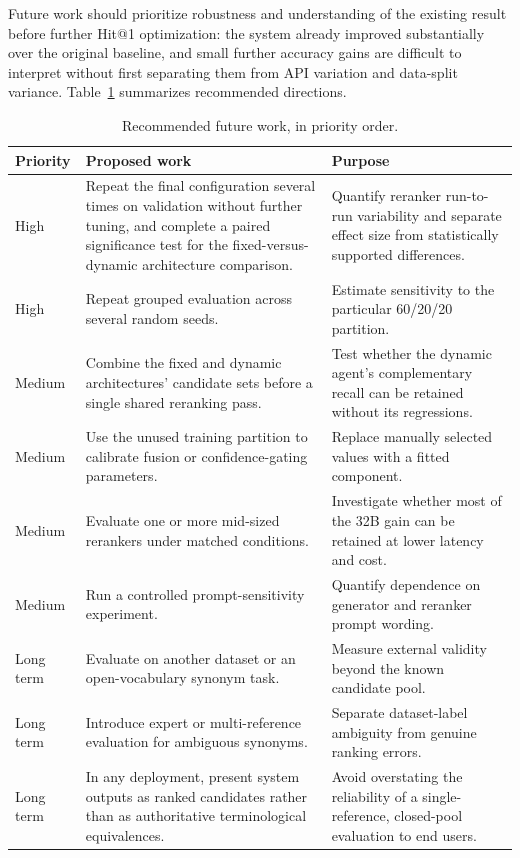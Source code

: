 Future work should prioritize robustness and understanding of the existing result before further Hit@1 optimization: the system already improved substantially over the original baseline, and small further accuracy gains are difficult to interpret without first separating them from API variation and data-split variance. Table~\ref{tab:future-work} summarizes recommended directions.

\begingroup
\footnotesize
\begin{table}[htbp]
\centering
\begin{tabular}{p{1.6cm}p{6.4cm}p{5.0cm}}
\toprule
\textbf{Priority} & \textbf{Proposed work} & \textbf{Purpose}\\
\midrule
High & Repeat the final configuration several times on validation without further tuning, and complete a paired significance test for the fixed-versus-dynamic architecture comparison. & Quantify reranker run-to-run variability and separate effect size from statistically supported differences.\\
High & Repeat grouped evaluation across several random seeds. & Estimate sensitivity to the particular 60/20/20 partition.\\
Medium & Combine the fixed and dynamic architectures' candidate sets before a single shared reranking pass. & Test whether the dynamic agent's complementary recall can be retained without its regressions.\\
Medium & Use the unused training partition to calibrate fusion or confidence-gating parameters. & Replace manually selected values with a fitted component.\\
Medium & Evaluate one or more mid-sized rerankers under matched conditions. & Investigate whether most of the 32B gain can be retained at lower latency and cost.\\
Medium & Run a controlled prompt-sensitivity experiment. & Quantify dependence on generator and reranker prompt wording.\\
Long term & Evaluate on another dataset or an open-vocabulary synonym task. & Measure external validity beyond the known candidate pool.\\
Long term & Introduce expert or multi-reference evaluation for ambiguous synonyms. & Separate dataset-label ambiguity from genuine ranking errors.\\
Long term & In any deployment, present system outputs as ranked candidates rather than as authoritative terminological equivalences. & Avoid overstating the reliability of a single-reference, closed-pool evaluation to end users.\\
\bottomrule
\end{tabular}
\caption{Recommended future work, in priority order.}
\label{tab:future-work}
\end{table}
\endgroup

